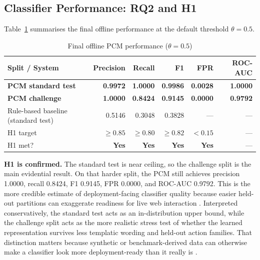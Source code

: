\documentclass[12pt,a4paper]{article}
\begin{document}
\subsection{Classifier Performance: RQ2 and H1}
 
Table~\ref{tab:main_results_final} summarises the final offline performance at
the default threshold $\theta = 0.5$.
 
\begin{table}[h]
\centering\small
\caption{Final offline PCM performance ($\theta = 0.5$)}
\label{tab:main_results_final}
\begin{tabular}{@{} l r r r r r @{}}
\toprule
\textbf{Split / System} & \textbf{Precision} & \textbf{Recall} &
\textbf{F1} & \textbf{FPR} & \textbf{ROC-AUC} \\
\midrule
\textbf{PCM standard test} & \textbf{0.9972} & \textbf{1.0000} &
\textbf{0.9986} & \textbf{0.0028} & \textbf{1.0000} \\
\textbf{PCM challenge} & \textbf{1.0000} & \textbf{0.8424} &
\textbf{0.9145} & \textbf{0.0000} & \textbf{0.9792} \\
Rule-based baseline (standard test) & 0.5146 & 0.3048 & 0.3828 & --- & --- \\
\midrule
H1 target & $\geq 0.85$ & $\geq 0.80$ & $\geq 0.82$ & $< 0.15$ & --- \\
H1 met?   & \textbf{Yes} & \textbf{Yes} & \textbf{Yes} & \textbf{Yes} & --- \\
\bottomrule
\end{tabular}
\end{table}
 
\textbf{H1 is confirmed.} The standard test is near ceiling, so the challenge
split is the main evidential result. On that harder split, the PCM still
achieves precision 1.0000, recall 0.8424, F1 0.9145, FPR 0.0000, and ROC-AUC
0.9792. This is the more credible estimate of deployment-facing classifier
quality because easier held-out partitions can exaggerate readiness for live web
interaction \citep{xue2025illusion}. Interpreted conservatively, the standard
test acts as an in-distribution upper bound, while the challenge split acts as
the more realistic stress test of whether the learned representation survives
less templatic wording and held-out action families. That distinction matters
because synthetic or benchmark-derived data can otherwise make a classifier look
 more deployment-ready than it really is \citep{li2023synthetic,geirhos2020shortcut}.
\end{document}
